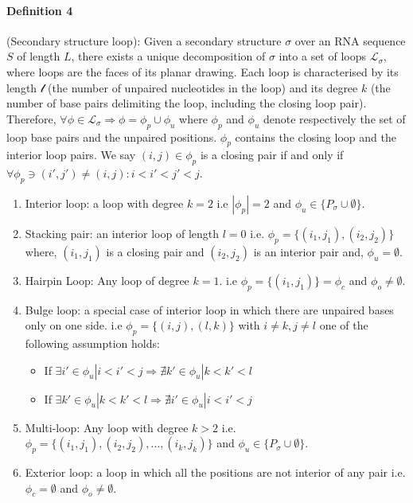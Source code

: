 \paragraph{\textbf{Definition 4} }(Secondary structure loop):  Given a secondary structure $\sigma$ over an RNA sequence $S$ of length $L$, there exists a unique decomposition of $\sigma$ into a set of loops $\mathcal{L}_{\sigma}$, where loops are the faces of its planar drawing. Each loop is characterised by its length $\mathcal{l}$ (the number of unpaired nucleotides in the loop) and its degree $k$ (the number of base pairs delimiting the loop, including the closing loop pair). 
Therefore, $\forall \phi \in \mathcal{L}_{\sigma} \Rightarrow \phi = \phi_p \cup \phi_u$ where $\phi_p$ and $\phi_u$ denote respectively the set of loop base pairs and the unpaired positions. $\phi_p$ contains the closing loop and the interior loop pairs. We say $(i,j) \in \phi_p$ is a closing pair if and only if $\forall \phi_p \ni (i',j') \neq (i,j) \colon i<i'<j'<j$.
\begin{enumerate}
	\item Interior loop: a loop with degree $k=2$ i.e $|\phi_p|=2$ and $\phi_u \in \{P_{\sigma} \cup \emptyset\}$.
	\item Stacking pair: an interior loop of length $l=0$ i.e. $\phi_p=\{(i_1,j_1), (i_2, j_2)\}$ where, $(i_1, j_1)$ is a closing pair  and $(i_2, j_2)$ is an interior pair and,  $\phi_u=\emptyset$.
	\item Hairpin Loop: Any loop of degree $k=1$.  i.e $\phi_p=\{(i_1,j_1)\}=\phi_c$ and  $\phi_o \neq \emptyset$.
	\item Bulge loop: a special case of interior loop in which there are unpaired bases only on one side. i.e  $\phi_p=\{(i,j), (l, k)\}$ with $i \neq k, j\neq l$ one of the following assumption holds: 
		\begin{itemize}
			\item If $\exists i'\in \phi_u | i<i'<j \Rightarrow \nexists k'\in \phi_u | k<k'<l$ 
			\item If $\exists k'\in \phi_u | k<k'<l \Rightarrow \nexists i'\in \phi_u | i<i'<j$ 
		\end{itemize}
	\item Multi-loop: Any loop with degree $k>2$ i.e.  $\phi_p=\{(i_1,j_1), (i_2, j_2), \dots, (i_k, j_k)\}$  and $\phi_u \in \{P_{\sigma} \cup \emptyset\}$.
	\item Exterior loop: a loop in which all the positions are not interior of any pair i.e. $\phi_c=\emptyset$ and $\phi_o \neq \emptyset$.
\end{enumerate}

